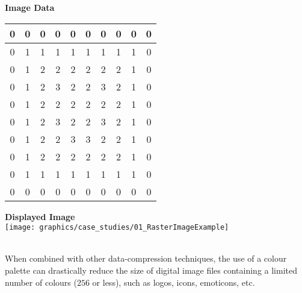       \begin{minipage}[t]{0.4\textwidth}
        \begin{center}
          \textbf{Image Data}
          \ \\[9pt]
          \renewcommand\arraystretch{1.25}
          \ttfamily\small
          \begin{tabular}{| c | c | c | c | c | c | c | c | c | c | }
            \hline
            0 & 0 & 0 & 0 & 0 & 0 & 0 & 0 & 0 & 0 \\
            \hline         
            0 & 1 & 1 & 1 & 1 & 1 & 1 & 1 & 1 & 0 \\
            \hline         
            0 & 1 & 2 & 2 & 2 & 2 & 2 & 2 & 1 & 0 \\
            \hline         
            0 & 1 & 2 & 3 & 2 & 2 & 3 & 2 & 1 & 0 \\
            \hline         
            0 & 1 & 2 & 2 & 2 & 2 & 2 & 2 & 1 & 0 \\
            \hline         
            0 & 1 & 2 & 3 & 2 & 2 & 3 & 2 & 1 & 0 \\
            \hline         
            0 & 1 & 2 & 2 & 3 & 3 & 2 & 2 & 1 & 0 \\
            \hline         
            0 & 1 & 2 & 2 & 2 & 2 & 2 & 2 & 1 & 0 \\
            \hline         
            0 & 1 & 1 & 1 & 1 & 1 & 1 & 1 & 1 & 0 \\
            \hline         
            0 & 0 & 0 & 0 & 0 & 0 & 0 & 0 & 0 & 0 \\         
            \hline         
          \end{tabular}
        \end{center}
      \end{minipage}
      \begin{minipage}[t]{0.4\textwidth}
        \begin{center}
          \textbf{Displayed Image}
          \ \\[9pt]
          \texttt{[image: graphics/case\_studies/01\_RasterImageExample]}
        \end{center}
      \end{minipage}
      \ \\[\baselineskip]
      When combined with other data-compression techniques, the use of a colour palette can drastically reduce the size of digital image files containing a limited number of colours ($256$ or less), such as logos, icons, emoticons, etc.
